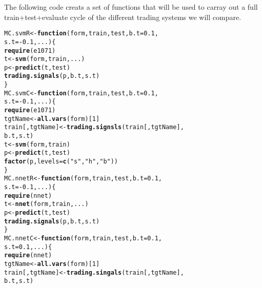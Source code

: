\documentclass{article}\usepackage[]{graphicx}\usepackage[]{color}
\makeatletter
\newcommand{\hlnum}[1]{\textcolor[rgb]{0.686,0.059,0.569}{#1}}%
\newcommand{\hlstr}[1]{\textcolor[rgb]{0.192,0.494,0.8}{#1}}%
\newcommand{\hlopt}[1]{\textcolor[rgb]{0,0,0}{#1}}%
\newcommand{\hlstd}[1]{\textcolor[rgb]{0.345,0.345,0.345}{#1}}%
\newcommand{\hlkwa}[1]{\textcolor[rgb]{0.161,0.373,0.58}{\textbf{#1}}}%
\newcommand{\hlkwb}[1]{\textcolor[rgb]{0.69,0.353,0.396}{#1}}%
\newcommand{\hlkwc}[1]{\textcolor[rgb]{0.333,0.667,0.333}{#1}}%
\newcommand{\hlkwd}[1]{\textcolor[rgb]{0.737,0.353,0.396}{\textbf{#1}}}%
\newenvironment{kframe}{%
 \def\at@end@of@kframe{}%
 \ifinner\ifhmode%
  \def\at@end@of@kframe{\end{minipage}}%
  \begin{minipage}{\columnwidth}%
 \fi\fi%
 \def\FrameCommand##1{\hskip\@totalleftmargin \hskip-\fboxsep
 \colorbox{shadecolor}{##1}\hskip-\fboxsep
     \hskip-\linewidth \hskip-\@totalleftmargin \hskip\columnwidth}%
 \MakeFramed {\advance\hsize-\width
   \@totalleftmargin\z@ \linewidth\hsize
   \@setminipage}}%
 {\par\unskip\endMakeFramed%
 \at@end@of@kframe}
\newenvironment{knitrout}{}{} %
\makeatother
\begin{document}
The following code creats a set of functions that will be used to carray out a full train+test+evaluate cycle of the different trading systems we will compare.
\begin{knitrout}
\color{fgcolor}\begin{kframe}
\begin{alltt}
\hlstd{MC.svmR} \hlkwb{<-} \hlkwa{function}\hlstd{(}\hlkwc{form}\hlstd{,} \hlkwc{train}\hlstd{,} \hlkwc{test}\hlstd{,} \hlkwc{b.t} \hlstd{=} \hlnum{0.1}\hlstd{,}
                    \hlkwc{s.t} \hlstd{=} \hlopt{-}\hlnum{0.1}\hlstd{,} \hlkwc{...}\hlstd{) \{}
  \hlkwd{require}\hlstd{(e1071)}
  \hlstd{t}\hlkwb{<-} \hlkwd{svm}\hlstd{(form, train, ...)}
  \hlstd{p} \hlkwb{<-} \hlkwd{predict}\hlstd{(t, test)}
  \hlkwd{trading.signals}\hlstd{(p, b.t, s.t)}
\hlstd{\}}
\hlstd{MC.svmC} \hlkwb{<-} \hlkwa{function}\hlstd{(}\hlkwc{form}\hlstd{,} \hlkwc{train}\hlstd{,} \hlkwc{test}\hlstd{,} \hlkwc{b.t} \hlstd{=} \hlnum{0.1}\hlstd{,}
                    \hlkwc{s.t} \hlstd{=} \hlopt{-}\hlnum{0.1}\hlstd{,}\hlkwc{...}\hlstd{) \{}
  \hlkwd{require}\hlstd{(e1071)}
  \hlstd{tgtName} \hlkwb{<-} \hlkwd{all.vars}\hlstd{(form)[}\hlnum{1}\hlstd{]}
  \hlstd{train[, tgtName]} \hlkwb{<-} \hlkwd{trading.signsls}\hlstd{(train[, tgtName],}
                                      \hlstd{b.t, s.t)}
  \hlstd{t} \hlkwb{<-} \hlkwd{svm}\hlstd{(form, train)}
  \hlstd{p} \hlkwb{<-} \hlkwd{predict}\hlstd{(t, test)}
  \hlkwd{factor}\hlstd{(p,} \hlkwc{levels} \hlstd{=} \hlkwd{c}\hlstd{(}\hlstr{"s"}\hlstd{,} \hlstr{"h"}\hlstd{,} \hlstr{"b"}\hlstd{))}
\hlstd{\}}
\hlstd{MC.nnetR} \hlkwb{<-} \hlkwa{function}\hlstd{(}\hlkwc{form}\hlstd{,} \hlkwc{train}\hlstd{,} \hlkwc{test}\hlstd{,} \hlkwc{b.t} \hlstd{=} \hlnum{0.1}\hlstd{,}
                     \hlkwc{s.t} \hlstd{=} \hlopt{-}\hlnum{0.1}\hlstd{,} \hlkwc{...}\hlstd{) \{}
  \hlkwd{require}\hlstd{(nnet)}
  \hlstd{t} \hlkwb{<-} \hlkwd{nnet}\hlstd{(form, train, ...)}
  \hlstd{p} \hlkwb{<-} \hlkwd{predict}\hlstd{(t, test)}
  \hlkwd{trading.signals}\hlstd{(p, b.t, s.t)}
\hlstd{\}}
\hlstd{MC.nnetC} \hlkwb{<-} \hlkwa{function}\hlstd{(}\hlkwc{form}\hlstd{,} \hlkwc{train}\hlstd{,} \hlkwc{test}\hlstd{,} \hlkwc{b.t} \hlstd{=} \hlnum{0.1}\hlstd{,}
                     \hlkwc{s.t} \hlstd{=} \hlnum{0.1}\hlstd{,} \hlkwc{...}\hlstd{) \{}
  \hlkwd{require}\hlstd{(nnet)}
  \hlstd{tgtName} \hlkwb{<-} \hlkwd{all.vars}\hlstd{(form)[}\hlnum{1}\hlstd{]}
  \hlstd{train[, tgtName]} \hlkwb{<-} \hlkwd{trading.singals}\hlstd{(train[ , tgtName],}
                                      \hlstd{b.t, s.t)}

\end{alltt}
\end{kframe}
\end{knitrout}
\end{document}
